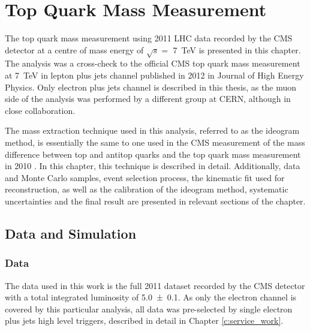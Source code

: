 
\chapter{Top Quark Mass Measurement}
\label{c:top_mass_analysis}
\ifpdf
    \graphicspath{{05_Mass_analysis/plots/}}
\else
    \graphicspath{{05_Mass_analysis/plots/EPS/}{05_Mass_analysis/plots/}}
\fi

The top quark mass measurement using 2011 LHC data recorded by the CMS detector at a centre of mass energy of $\sqrt s
=$ \SI{7}{\TeV} is presented in this chapter. The analysis was a cross-check to the official CMS top quark mass
measurement at \SI{7}{\TeV} in lepton plus jets channel published in 2012 \autocite{top_mass_ljets_CMS} in Journal of
High Energy Physics. Only electron plus jets channel is described in this thesis, as the muon side of the analysis was
performed by a different group at CERN, although in close collaboration.

The mass extraction technique used in this analysis, referred to as the ideogram method, is essentially the same to one
used in the CMS measurement of the mass difference between top and antitop quarks \autocite{mass_difference_CMS} and the
top quark mass measurement in 2010 \autocite{top_mass_ljets_CMS_2010}. In this chapter, this technique is described in
detail. Additionally, data and Monte Carlo samples, event selection process, the kinematic fit used for \ttbar
reconstruction, as well as the calibration of the ideogram method, systematic uncertainties and the final result are
presented in relevant sections of the chapter.

\section{Data and Simulation}
\label{s_top_mass:data_and_simulation}

\subsection{Data}
\label{ss_top_mass:data}
The data used in this work is the full 2011 dataset recorded by the CMS detector with a total integrated luminosity of
\SI{5.0 \pm 0.1}{\fbinv}. As only the electron channel is covered by this particular analysis, all data was pre-selected
by single electron plus jets high level triggers, described in detail in Chapter \ref{c:service_work}.


